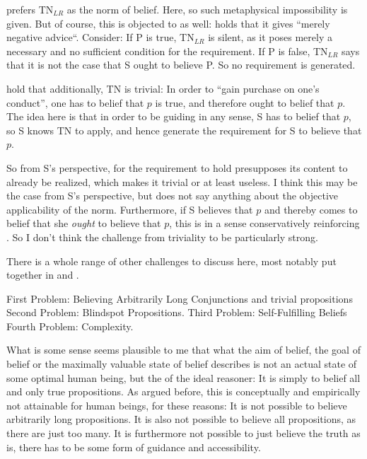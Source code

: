 \documentclass[12pt,numbers=noenddot]{scrartcl}
\begin{document}
\textcite[101]{Boghossian2008-BOGCAJ} prefers TN$_{LR}$ as the norm of belief. Here, so such metaphysical impossibility is given. But of course, this is objected to as well: \textcite[208]{Engel199} holds that it gives “merely negative advice“. Consider: If P is true, TN$_{LR}$ is silent, as it poses merely a necessary and no sufficient condition for the requirement. If P is false, TN$_{LR}$ says that it is not the case that S ought to believe P. So no requirement is generated.


\textcite{Gluer2009-GLEACN-2} hold that additionally, TN is trivial: In order to “gain purchase on one's conduct”, one has to belief that $p$ is true, and therefore ought to belief that $p$. The idea here is that in order to be guiding in any sense, S has to belief that $p$, so S knows TN to apply, and hence generate the requirement for S to believe that $p$. 

So from S's perspective, for the requirement to hold presupposes its content to already be realized, which makes it trivial or at least useless. I think this may be the case from S's perspective, but does not say anything about the objective applicability of the norm. Furthermore, if S believes that $p$ and thereby comes to belief that she \emph{ought} to believe that $p$, this is in a sense conservatively reinforcing \autocite[751]{Steglich-Petersen2010}. So I don't think the challenge from triviality to be particularly strong.

There is a whole range of other challenges to discuss here, most notably put together in \textcite{Greenberg2016-GREITN} and \textcite{Mchugh2012-MCHTTN}.

First Problem: Believing Arbitrarily Long Conjunctions and trivial propositions
Second Problem: Blindspot Propositions.
Third Problem: Self-Fulfilling Beliefs
Fourth Problem: Complexity.



What is some sense seems plausible to me that what the aim of belief, the goal of belief or the maximally valuable state of belief describes is not an actual state of some optimal human being, but the of the ideal reasoner: It is simply to belief all and only true propositions. As argued before, this is conceptually and empirically not attainable for human beings, for these reasons: It is not possible to believe arbitrarily long propositions. It is also not possible to believe all propositions, as there are just too many. It is furthermore not possible to just believe the truth as is, there has to be some form of guidance and accessibility.
\end{document}
